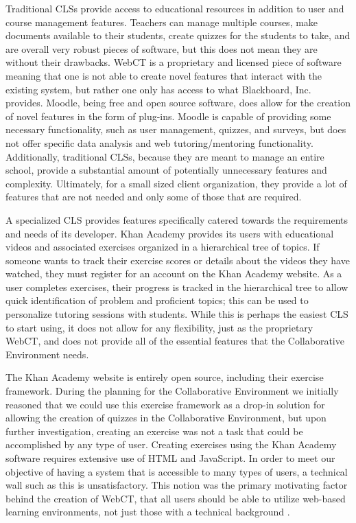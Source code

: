Traditional CLSs provide access to educational resources in addition to user and course management features. Teachers can manage multiple courses, make documents available to their students, create quizzes for the students to take, and are overall very robust pieces of software, but this does not mean they are without their drawbacks. WebCT is a proprietary and licensed piece of software meaning that one is not able to create novel features that interact with the existing system, but rather one only has access to what Blackboard, Inc. provides. Moodle, being free and open source software, does allow for the creation of novel features in the form of plug-ins. Moodle is capable of providing some necessary functionality, such as user management, quizzes, and surveys, but does not offer specific data analysis and web tutoring/mentoring functionality. Additionally, traditional CLSs, because they are meant to manage an entire school, provide a substantial amount of potentially unnecessary features and complexity. Ultimately, for a small sized client organization, they provide a lot of features that are not needed and only some of those that are required.

A specialized CLS provides features specifically catered towards the requirements and needs of its developer. Khan Academy provides its users with educational videos and associated exercises organized in a hierarchical tree of topics. If someone wants to track their exercise scores or details about the videos they have watched, they must register for an account on the Khan Academy website. As a user completes exercises, their progress is tracked in the hierarchical tree to allow quick identification of problem and proficient topics; this can be used to personalize tutoring sessions with students. While this is perhaps the easiest CLS to start using, it does not allow for any flexibility, just as the proprietary WebCT, and does not provide all of the essential features that the Collaborative Environment needs.

The Khan Academy website is entirely open source, including their exercise framework. During the planning for the Collaborative Environment we initially reasoned that we could use this exercise framework as a drop-in solution for allowing the creation of quizzes in the Collaborative Environment, but upon further investigation, creating an exercise was not a task that could be accomplished by any type of user. Creating exercises using the Khan Academy software requires extensive use of HTML and JavaScript. In order to meet our objective of having a system that is accessible to many types of users, a technical wall such as this is unsatisfactory. This notion was the primary motivating factor behind the creation of WebCT, that all users should be able to utilize web-based learning environments, not just those with a technical background \cite{webct}.

